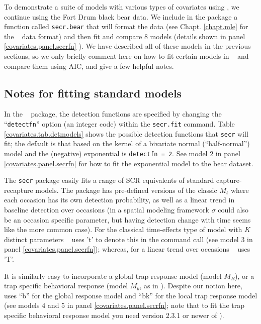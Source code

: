 To demonstrate
a suite of models with various types of covariates using \secr, we
continue using the Fort Drum black bear data. 
We include in the \scrbook package a function called {\tt secr.bear}
that will format the data (see Chapt. \ref{chapt.mle} for the \secr~
data format) and then fit and compare 8 models (details shown in panel
\ref{covariates.panel.secrfn} ).  We have described all of these
models in the previous sections, so we only briefly comment here on
how to fit certain models in \secr~ and compare them using AIC, and
give a few helpful notes.

\subsection{Notes for fitting standard models}

In the \secr~ package, the detection functions are specified
by changing the ``\mbox{\tt detectfn}'' option (an integer code)
within the \mbox{\tt secr.fit} command.  Table
\ref{covariates.tab.detmodels} shows the possible detection functions
that \mbox{\tt secr} will fit; the default is that based on the kernel
of a bivariate normal
(``half-normal'') model and the
(negative) exponential is \mbox{\tt detectfn = 2}.  See model 2 in 
panel \ref{covariates.panel.secrfn} for how to fit the exponential 
model to the bear dataset. 

The \mbox{\tt secr} package easily fits a range of SCR equivalents of standard capture-recapture models.
The package has pre-defined versions of the classic
$M_{t}$ where each
occasion has its own detection probability, as well as a linear
trend in baseline detection over occasions (in a spatial modeling framework $\sigma$ could also be an occasion specific parameter, but having detection change with time seems like the more common case). For the classical
time-effects type of model with $K$ distinct parameters \secr~ uses 't' to denote
this in the command call (see model 3 in 
panel \ref{covariates.panel.secrfn}); whereas, for a linear
trend over occasions \secr~ uses 'T'.

It is similarly easy to incorporate a global trap response model (model $M_{B}$), 
or a trap specific behavioral response (model $M_{b}$, as in
\citet{royle_etal:2011jwm}). Despite our notion here, \secr~ uses ``b'' for the global response model and
 ``bk'' for the local trap response model
(see models 4 and 5 in 
panel \ref{covariates.panel.secrfn}; note that to fit the trap specific behavioral response model you need version 2.3.1 or newer of \secr).

